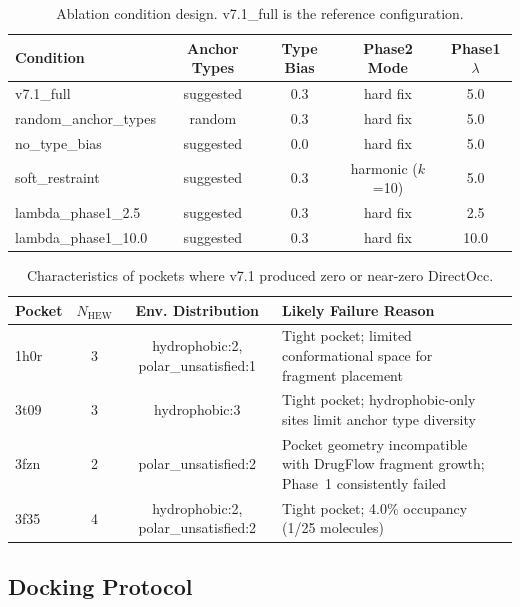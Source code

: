 \documentclass[11pt,letterpaper]{article}
\begin{document}
\begin{table}[H]
  \centering
  \caption{Ablation condition design.  v7.1\_full is the reference
           configuration.}
  \label{tab:ablation_design}
  \small
  \begin{tabular}{l c c c c}
    \toprule
    \textbf{Condition} & \textbf{Anchor Types} & \textbf{Type Bias} & \textbf{Phase2 Mode} & \textbf{Phase1 $\lambda$} \\
    \midrule
    v7.1\_full              & suggested & 0.3 & hard fix       & 5.0 \\
    random\_anchor\_types    & random    & 0.3 & hard fix       & 5.0 \\
    no\_type\_bias           & suggested & 0.0 & hard fix       & 5.0 \\
    soft\_restraint          & suggested & 0.3 & harmonic ($k$=10) & 5.0 \\
    lambda\_phase1\_2.5      & suggested & 0.3 & hard fix       & 2.5 \\
    lambda\_phase1\_10.0     & suggested & 0.3 & hard fix       & 10.0 \\
    \bottomrule
  \end{tabular}
\end{table}

\begin{table}[H]
  \centering
  \caption{Characteristics of pockets where v7.1 produced zero or near-zero
           DirectOcc.}
  \label{tab:failures}
  \small
  \begin{tabular}{l c c p{4cm} p{4cm}}
    \toprule
    \textbf{Pocket} & \textbf{$N_{\text{HEW}}$} & \textbf{Env. Distribution} & \textbf{Likely Failure Reason} \\
    \midrule
    1h0r & 3 & hydrophobic:2, polar\_unsatisfied:1 & Tight pocket; limited conformational space for fragment placement \\
    3t09 & 3 & hydrophobic:3 & Tight pocket; hydrophobic-only sites limit anchor type diversity \\
    3fzn & 2 & polar\_unsatisfied:2 & Pocket geometry incompatible with DrugFlow fragment growth; Phase~1 consistently failed \\
    3f35 & 4 & hydrophobic:2, polar\_unsatisfied:2 & Tight pocket; 4.0\% occupancy (1/25 molecules) \\
    \bottomrule
  \end{tabular}
\end{table}

\subsection{Docking Protocol}
\end{document}
